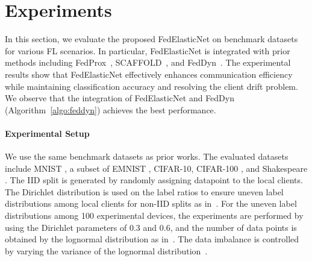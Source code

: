 \documentclass{article} %
\begin{document}



\section{Experiments} \label{section:experiments}



In this section, we evaluate the proposed FedElasticNet on benchmark datasets for various FL scenarios. In particular, FedElasticNet is integrated with prior methods including FedProx~\citep{Li2020federated}, SCAFFOLD~\citep{Karimireddy2020scaffold}, and FedDyn~\citep{Acar2021federated}. The experimental results show that FedElasticNet effectively enhances communication efficiency while maintaining classification accuracy and resolving the client drift problem. We observe that the integration of FedElasticNet and FedDyn (Algorithm~\ref{algo:feddyn}) achieves the best performance. 


\paragraph{Experimental Setup}

We use the same benchmark datasets as prior works. The evaluated datasets include MNIST \citep{Lecun1998gradient}, a subset of EMNIST \citep[EMNIST-L]{Cohen2017emnist}, CIFAR-10, CIFAR-100 \citep{Krizhevsky2009learning}, and Shakespeare \citep{Shakespeare1914complete}. The IID split is generated by randomly assigning datapoint to the local clients. The Dirichlet distribution is used on the label ratios to ensure uneven label distributions among local clients for non-IID splits as in~\citet{Zhao2018federated,Acar2021federated}. For the uneven label distributions among 100 experimental devices, the experiments are performed by using the Dirichlet parameters of 0.3 and 0.6, and the number of data points is obtained by the lognormal distribution as in~\citet{Acar2021federated}. The data imbalance is controlled by varying the variance of the lognormal distribution~\citep{Acar2021federated}. 
\end{document}
